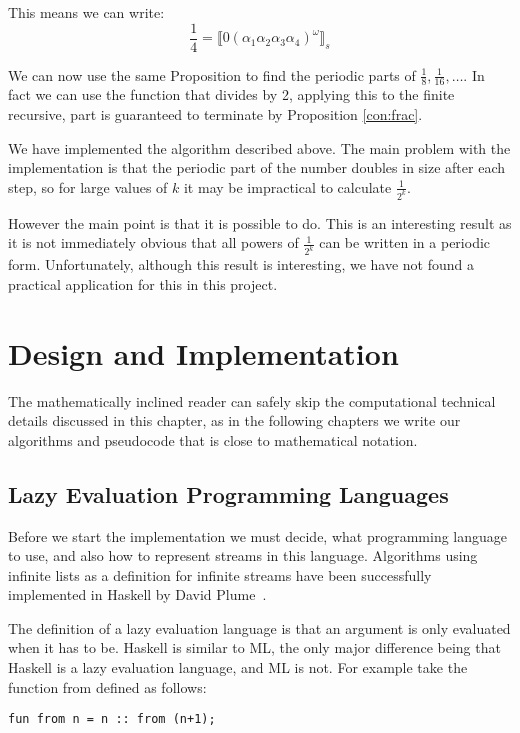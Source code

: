 \documentclass{cs4rep}
\begin{document}
This means we can write:
\[\frac{1}{4} = \llbracket 0(\alpha_{1}\alpha_{2}\alpha_{3}\alpha_{4})^{\omega} \rrbracket_{s} \]

We can now use the same Proposition to find the periodic parts of
$\frac{1}{8},\frac{1}{16}, \ldots $. In fact we can use the function
that divides by 2, applying this to the finite recursive, part is
guaranteed to terminate by Proposition \ref{con:frac}.

We have implemented the algorithm described above.
The main problem with the implementation is that the periodic part of
the number doubles in size after each step, so for large values of $k$
it may be impractical to calculate $\frac{1}{2^{k}}$.

However the main point is that it is possible to do. This is an
interesting result as it is not immediately obvious that all powers of
$\frac{1}{2^{k}}$ can be written in a periodic form. Unfortunately,
although this result is interesting, we have not found a practical
application for this in this project.


\chapter{Design and Implementation} \label{ch:dai}

The mathematically inclined reader can safely skip the computational
technical details discussed in this chapter, as in the following
chapters we write our algorithms and pseudocode that is close to
mathematical notation.

\section{Lazy Evaluation Programming Languages}

Before we start the implementation we must decide, what programming
language to use, and also how to represent streams in this language.
Algorithms using infinite lists as a definition for infinite streams
have been successfully implemented in Haskell by David
Plume~\cite{kn:Plume}.

The definition of a lazy evaluation language is that an argument is
only evaluated when it has to be. Haskell is similar to ML, the only
major difference being that Haskell is a lazy evaluation language, and
ML is not. For example take the function from defined as follows:

{\tt fun from n = n :: from (n+1);}
\end{document}
